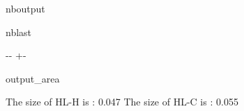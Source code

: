 \documentclass[letterpaper,10pt,english]{sphinxmanual}
\begin{document}
\begin{sphinxuseclass}{nboutput}
\begin{sphinxuseclass}{nblast}
{

\kern-\sphinxverbatimsmallskipamount\kern-\baselineskip
\kern+\FrameHeightAdjust\kern-\fboxrule
\vspace{\nbsphinxcodecellspacing}

\begin{sphinxuseclass}{output_area}
\begin{sphinxuseclass}{}


\begin{sphinxVerbatim}[commandchars=\\\{\}]
The size of HL-H is : 0.047
The size of HL-C is : 0.055
\end{sphinxVerbatim}



\end{sphinxuseclass}
\end{sphinxuseclass}
}

\end{sphinxuseclass}
\end{sphinxuseclass}
\end{document}
